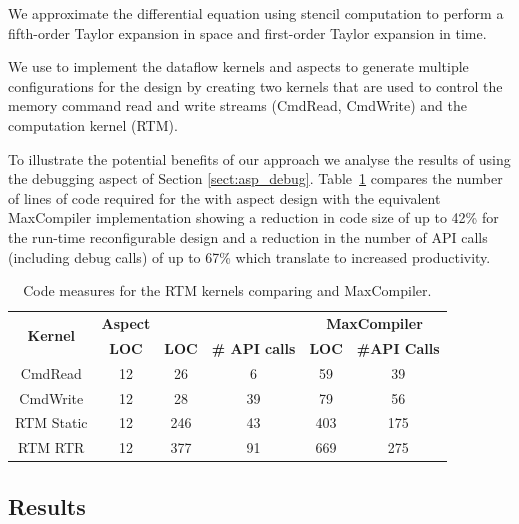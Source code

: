 We approximate the differential equation using stencil computation to
perform a fifth-order Taylor expansion in space and first-order Taylor
expansion in time.

We use \FAST{} to implement the dataflow kernels and aspects to
generate multiple configurations for the design by creating two
kernels that are used to control the memory command read and write
streams (CmdRead, CmdWrite) and the computation kernel (RTM).

To illustrate the potential benefits of our approach we analyse the
results of using the debugging aspect of Section
\ref{sect:asp_debug}. Table~\ref{table:loc} compares the number of
lines of code required for the \FAST{} with aspect design with the
equivalent MaxCompiler implementation showing a reduction in code size
of up to 42\% for the run-time reconfigurable design and a reduction
in the number of API calls (including debug calls) of up to 67\% which
translate to increased productivity.

\begin{table}[!h]
  \renewcommand{\arraystretch}{1.2}
  \centering
  \caption{Code measures for the RTM kernels comparing \FAST{} and
    MaxCompiler.}
  \label{table:loc}
  \begin{tabular}{c|ccc|cc}
    \hline
    \multirow{2}{*}{\bf{Kernel}} & \bf{Aspect } & \multicolumn{2}{c|}{\bf{\FAST{}}} & \multicolumn{2}{c}{\bf{MaxCompiler}}                   \\
    \                            & \bf{LOC}     & \bf{LOC}                       & \bf{\# API calls} & \bf{LOC} & \bf{\#API Calls} \\
    \hline \hline
    CmdRead                      & 12           & 26                             &      6         & 59       &      39        \\
    CmdWrite                     & 12           & 28                             &      39        & 79      &       56         \\
    RTM Static                   & 12           & 246                            &     43         & 403     &       175        \\
    RTM RTR                      & 12           & 377                            &     91         & 669     &       275       \\
  \end{tabular}
\end{table}

\subsection{Results}

